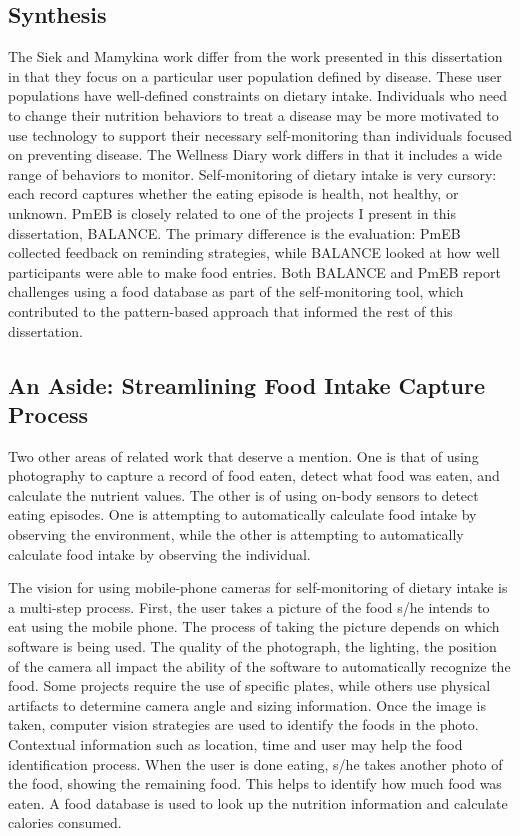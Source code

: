\subsection{Synthesis}
The Siek and Mamykina work differ from the work presented in this dissertation in that they focus on a particular user population defined by disease. These user populations have well-defined constraints on dietary intake. Individuals who need to change their nutrition behaviors to treat a disease may be more motivated to use technology to support their necessary self-monitoring than individuals focused on preventing disease. The Wellness Diary work differs in that it includes a wide range of behaviors to monitor. Self-monitoring of dietary intake is very cursory: each record captures whether the eating episode is health, not healthy, or unknown. PmEB is closely related to one of the projects I present in this dissertation, BALANCE. The primary difference is the evaluation: PmEB collected feedback on reminding strategies, while BALANCE looked at how well participants were able to make food entries. Both BALANCE and PmEB report challenges using a food database as part of the self-monitoring tool, which contributed to the pattern-based approach that informed the rest of this dissertation. 

\subsection{An Aside: Streamlining Food Intake Capture Process}
Two other areas of related work that deserve a mention. One is that of using photography to capture a record of food eaten, detect what food was eaten, and calculate the nutrient values. The other is of using on-body sensors to detect eating episodes. One is attempting to automatically calculate food intake by observing the environment, while the other is attempting to automatically calculate food intake by observing the individual. 

The vision for using mobile-phone cameras for self-monitoring of dietary intake is a multi-step process. First, the user takes a picture of the food s/he intends to eat using the mobile phone. The process of taking the picture depends on which software is being used. The quality of the photograph, the lighting, the position of the camera all impact the ability of the software to automatically recognize the food. Some projects require the use of specific plates, while others use physical artifacts to determine camera angle and sizing information. Once the image is taken, computer vision strategies are used to identify the foods in the photo. Contextual information such as location, time and user may help the food identification process. When the user is done eating, s/he takes another photo of the food, showing the remaining food. This helps to identify how much food was eaten. A food database is used to look up the nutrition information and calculate calories consumed. 

